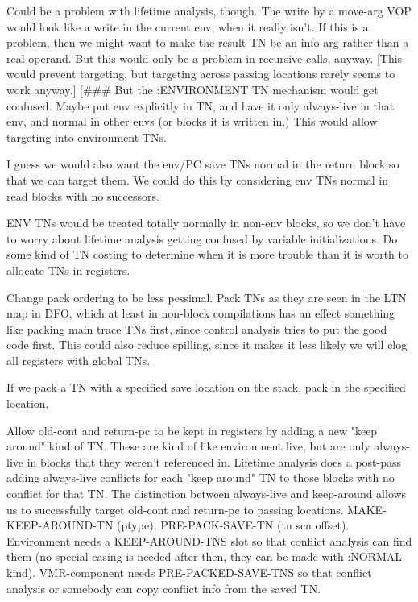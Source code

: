 Could be a problem with lifetime analysis, though.  The write by a move-arg VOP
would look like a write in the current env, when it really isn't.  If this is a
problem, then we might want to make the result TN be an info arg rather than a
real operand.  But this would only be a problem in recursive calls, anyway.
[This would prevent targeting, but targeting across passing locations rarely
seems to work anyway.]  [\#\#\# But the :ENVIRONMENT TN mechanism would get
confused.  Maybe put env explicitly in TN, and have it only always-live in that
env, and normal in other envs (or blocks it is written in.)  This would allow
targeting into environment TNs.  

I guess we would also want the env/PC save TNs normal in the return block so
that we can target them.  We could do this by considering env TNs normal in
read blocks with no successors.  

ENV TNs would be treated totally normally in non-env blocks, so we don't have
to worry about lifetime analysis getting confused by variable initializations.
Do some kind of TN costing to determine when it is more trouble than it is
worth to allocate TNs in registers.

Change pack ordering to be less pessimal.  Pack TNs as they are seen in the LTN
map in DFO, which at least in non-block compilations has an effect something
like packing main trace TNs first, since control analysis tries to put the good
code first.  This could also reduce spilling, since it makes it less likely we
will clog all registers with global TNs.

If we pack a TN with a specified save location on the stack, pack in the
specified location.

Allow old-cont and return-pc to be kept in registers by adding a new "keep
around" kind of TN.  These are kind of like environment live, but are only
always-live in blocks that they weren't referenced in.  Lifetime analysis does
a post-pass adding always-live conflicts for each "keep around" TN to those
blocks with no conflict for that TN.  The distinction between always-live and
keep-around allows us to successfully target old-cont and return-pc to passing
locations.  MAKE-KEEP-AROUND-TN (ptype), PRE-PACK-SAVE-TN (tn scn offset).
Environment needs a KEEP-AROUND-TNS slot so that conflict analysis can find
them (no special casing is needed after then, they can be made with :NORMAL
kind).  VMR-component needs PRE-PACKED-SAVE-TNS so that conflict analysis or
somebody can copy conflict info from the saved TN.



